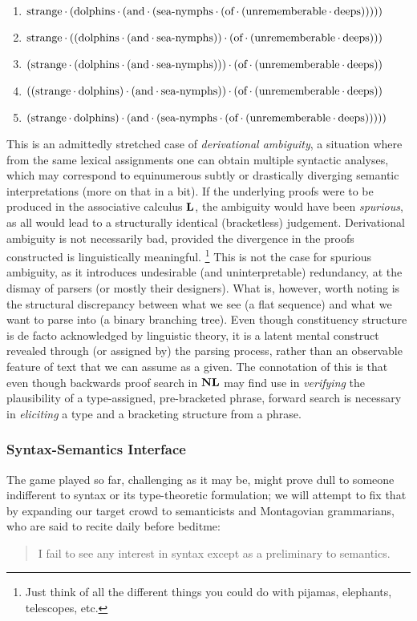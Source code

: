 {\smaller
\begin{enumerate}
\item $\text{strange}\mkern-0.5mu\cdot\mkern-0.5mu (\text{dolphins}\mkern-0.5mu\cdot\mkern-0.5mu (\text{and}\mkern-0.5mu\cdot\mkern-0.5mu (\text{sea-nymphs}\mkern-0.5mu\cdot\mkern-0.5mu (\text{of}\mkern-0.5mu\cdot\mkern-0.5mu (\text{unrememberable}\mkern-0.5mu\cdot\mkern-0.5mu \text{deeps})))))$
\item $\text{strange}\mkern-0.5mu\cdot\mkern-0.5mu ((\text{dolphins}\mkern-0.5mu\cdot\mkern-0.5mu (\text{and}\mkern-0.5mu\cdot\mkern-0.5mu \text{sea-nymphs}))\mkern-0.5mu\cdot\mkern-0.5mu (\text{of}\mkern-0.5mu\cdot\mkern-0.5mu (\text{unrememberable}\mkern-0.5mu\cdot\mkern-0.5mu \text{deeps})))$
\item $(\text{strange}\mkern-0.5mu\cdot\mkern-0.5mu (\text{dolphins}\mkern-0.5mu\cdot\mkern-0.5mu (\text{and}\mkern-0.5mu\cdot\mkern-0.5mu \text{sea-nymphs})))\mkern-0.5mu\cdot\mkern-0.5mu (\text{of}\mkern-0.5mu\cdot\mkern-0.5mu (\text{unrememberable}\mkern-0.5mu\cdot\mkern-0.5mu \text{deeps}))$
\item $((\text{strange}\mkern-0.5mu\cdot\mkern-0.5mu \text{dolphins})\mkern-0.5mu\cdot\mkern-0.5mu (\text{and}\mkern-0.5mu\cdot\mkern-0.5mu \text{sea-nymphs}))\mkern-0.5mu\cdot\mkern-0.5mu (\text{of}\mkern-0.5mu\cdot\mkern-0.5mu (\text{unrememberable}\mkern-0.5mu\cdot\mkern-0.5mu \text{deeps}))$
\item $(\text{strange}\mkern-0.5mu\cdot\mkern-0.5mu \text{dolphins})\mkern-0.5mu\cdot\mkern-0.5mu (\text{and}\mkern-0.5mu\cdot\mkern-0.5mu (\text{sea-nymphs}\mkern-0.5mu\cdot\mkern-0.5mu (\text{of}\mkern-0.5mu\cdot\mkern-0.5mu (\text{unrememberable}\mkern-0.5mu\cdot\mkern-0.5mu \text{deeps})))))$
\end{enumerate}
}
This is an admittedly stretched case of \textit{derivational ambiguity}, a situation where from the same lexical assignments one can obtain multiple syntactic analyses, which may correspond to equinumerous subtly or drastically diverging semantic interpretations (more on that in a bit).
If the underlying proofs were to be produced in the associative calculus $\textbf{L}$, the ambiguity would have been \textit{spurious}, as all would lead to a structurally identical (bracketless) judgement.
Derivational ambiguity is not necessarily bad, provided the divergence in the proofs constructed is linguistically meaningful.%
\footnote{Just think of all the different things you could do with pijamas, elephants, telescopes, etc.}
This is not the case for spurious ambiguity, as it introduces undesirable (and uninterpretable) redundancy, at the dismay of parsers (or mostly their designers).
What is, however, worth noting is the structural discrepancy between what we see (a flat sequence) and what we want to parse into (a binary branching tree).
Even though constituency structure is de facto acknowledged by linguistic theory, it is a latent mental construct revealed through (or assigned by) the parsing process, rather than an observable feature of text that we can assume as a given.
The connotation of this is that even though backwards proof search in $\textbf{NL}$ may find use in \textit{verifying} the plausibility of a type-assigned, pre-bracketed phrase, forward search is necessary in \textit{eliciting} a type and a bracketing structure from a phrase. 

\subsubsection{Syntax-Semantics Interface}\label{subsubsection:ssi_tlg}
The game played so far, challenging as it may be, might prove dull to someone indifferent to syntax or its type-theoretic formulation; we will attempt to fix that by expanding our target crowd to semanticists and Montagovian grammarians, who are said to recite daily before beditme:
\begin{quote}
I fail to see any interest in syntax except as a preliminary to semantics.~\cite{montague1970universal}
\end{quote}

